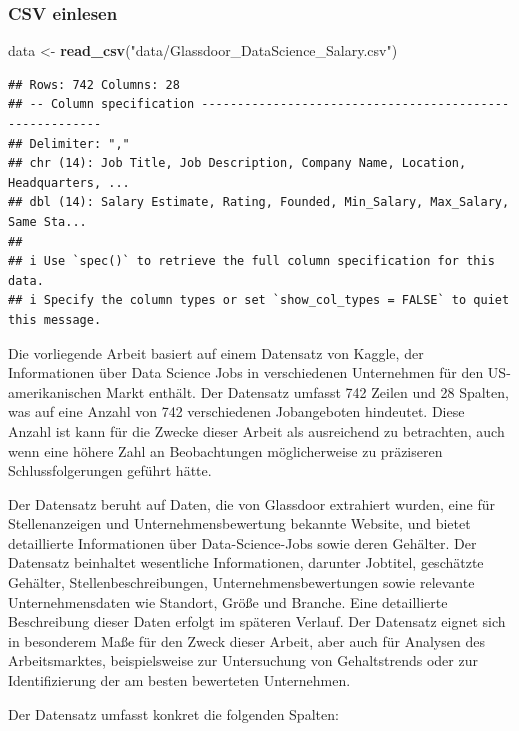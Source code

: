 \documentclass[
]{article}
\newenvironment{Shaded}{\begin{snugshade}}{\end{snugshade}}
\newcommand{\FunctionTok}[1]{\textcolor[rgb]{0.13,0.29,0.53}{\textbf{#1}}}
\newcommand{\NormalTok}[1]{#1}
\newcommand{\OtherTok}[1]{\textcolor[rgb]{0.56,0.35,0.01}{#1}}
\newcommand{\StringTok}[1]{\textcolor[rgb]{0.31,0.60,0.02}{#1}}
\begin{document}
\subsubsection{CSV einlesen}\label{csv-einlesen}

\begin{Shaded}
\begin{Highlighting}[]
\NormalTok{data }\OtherTok{\textless{}{-}} \FunctionTok{read\_csv}\NormalTok{(}\StringTok{"data/Glassdoor\_DataScience\_Salary.csv"}\NormalTok{)}
\end{Highlighting}
\end{Shaded}

\begin{verbatim}
## Rows: 742 Columns: 28
## -- Column specification --------------------------------------------------------
## Delimiter: ","
## chr (14): Job Title, Job Description, Company Name, Location, Headquarters, ...
## dbl (14): Salary Estimate, Rating, Founded, Min_Salary, Max_Salary, Same Sta...
## 
## i Use `spec()` to retrieve the full column specification for this data.
## i Specify the column types or set `show_col_types = FALSE` to quiet this message.
\end{verbatim}

Die vorliegende Arbeit basiert auf einem Datensatz von Kaggle, der
Informationen über Data Science Jobs in verschiedenen Unternehmen für
den US-amerikanischen Markt enthält. Der Datensatz umfasst 742 Zeilen
und 28 Spalten, was auf eine Anzahl von 742 verschiedenen Jobangeboten
hindeutet. Diese Anzahl ist kann für die Zwecke dieser Arbeit als
ausreichend zu betrachten, auch wenn eine höhere Zahl an Beobachtungen
möglicherweise zu präziseren Schlussfolgerungen geführt hätte.

Der Datensatz beruht auf Daten, die von Glassdoor extrahiert wurden,
eine für Stellenanzeigen und Unternehmensbewertung bekannte Website, und
bietet detaillierte Informationen über Data-Science-Jobs sowie deren
Gehälter. Der Datensatz beinhaltet wesentliche Informationen, darunter
Jobtitel, geschätzte Gehälter, Stellenbeschreibungen,
Unternehmensbewertungen sowie relevante Unternehmensdaten wie Standort,
Größe und Branche. Eine detaillierte Beschreibung dieser Daten erfolgt
im späteren Verlauf. Der Datensatz eignet sich in besonderem Maße für
den Zweck dieser Arbeit, aber auch für Analysen des Arbeitsmarktes,
beispielsweise zur Untersuchung von Gehaltstrends oder zur
Identifizierung der am besten bewerteten Unternehmen.

Der Datensatz umfasst konkret die folgenden Spalten:
\end{document}
